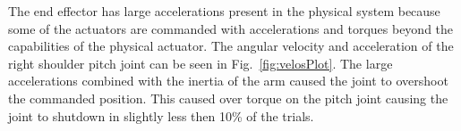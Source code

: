The end effector has large accelerations present in the physical system because some of the actuators are commanded with accelerations and torques beyond the capabilities of the physical actuator.  The angular velocity and acceleration of the right shoulder pitch joint can be seen in Fig.~\ref{fig:velosPlot}.  The large accelerations combined with the inertia of the arm caused the joint to overshoot the commanded position.  This caused over torque on the pitch joint causing the joint to shutdown in slightly less then 10\% of the trials.











